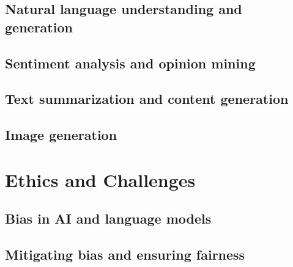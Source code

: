 \documentclass[
]{book}
\begin{document}
\hypertarget{natural-language-understanding-and-generation}{%
\section*{Natural language understanding and generation}\label{natural-language-understanding-and-generation}}

\hypertarget{sentiment-analysis-and-opinion-mining}{%
\section*{Sentiment analysis and opinion mining}\label{sentiment-analysis-and-opinion-mining}}

\hypertarget{text-summarization-and-content-generation}{%
\section*{Text summarization and content generation}\label{text-summarization-and-content-generation}}

\hypertarget{image-generation}{%
\section*{Image generation}\label{image-generation}}

\hypertarget{ethics-and-challenges}{%
\chapter*{Ethics and Challenges}\label{ethics-and-challenges}}

\hypertarget{bias-in-ai-and-language-models}{%
\section*{Bias in AI and language models}\label{bias-in-ai-and-language-models}}

\hypertarget{mitigating-bias-and-ensuring-fairness}{%
\section*{Mitigating bias and ensuring fairness}\label{mitigating-bias-and-ensuring-fairness}}
\end{document}
